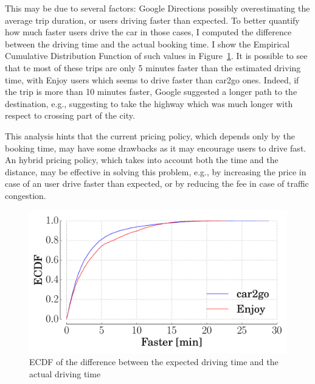 This may be due to several factors: Google Directions possibly overestimating the average trip duration, or users driving faster than expected.
To better quantify how much faster users drive the car in those cases, I  computed the difference between the driving time and the actual booking time. I show the Empirical Cumulative Distribution Function of such values in Figure~\ref{fig:3_5_cdf_faster_google}. It is possible to see that te most of these trips are only 5 minutes faster than the estimated driving time, with Enjoy users which seems to drive faster than car2go ones. Indeed, if the trip is more than 10 minutes faster, Google suggested a longer path to the destination, e.g., suggesting to take the highway which was much longer with respect to crossing part of the city.

This analysis hints that the current pricing policy, which depends only by the booking time, may have some drawbacks as it may encourage users to drive fast. An hybrid pricing policy, which takes into account both the time and the distance, may be effective in solving this problem, e.g., by increasing the price in case of an user drive faster than expected, or by reducing the fee in case of traffic congestion.

\begin{figure}[h!]
	\centering
	\includegraphics[width=0.85\columnwidth]{figures/faster_driving.pdf}
	\caption{ECDF of the difference between the expected driving time and the actual driving time\label{fig:3_5_cdf_faster_google}}
\end{figure}




